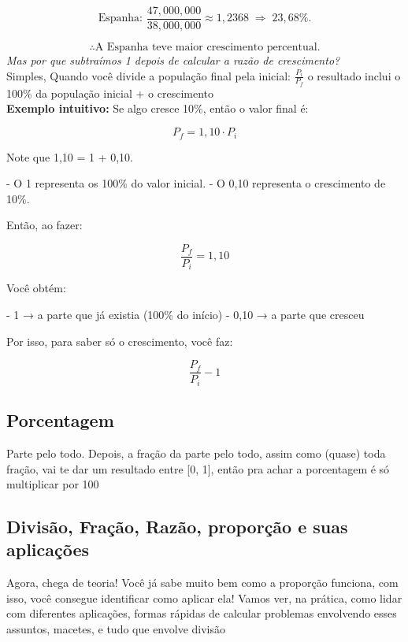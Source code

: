 \documentclass{article}
\begin{document}
\begin{itemize}
    \[
    \text{Espanha: } 
    \frac{47{,}000{,}000}{38{,}000{,}000} \approx 1{,}2368 
    \;\Rightarrow\; 23{,}68\%.
    \]
    
    \[
    \therefore \text{A Espanha teve maior crescimento percentual.}
    \]
    \textit{Mas por que subtraímos 1 depois de calcular a razão de crescimento?}
    \\[5pt]
    Simples, Quando você divide a população final pela inicial: $\frac{P_i}{P_f}$ o resultado inclui o 100\% da população inicial + o crescimento
    \\[5pt]
    \textbf{Exemplo intuitivo:} Se algo cresce 10\%, então o valor final é:

    \[
    P_f = 1,10 \cdot P_i
    \]
    
    Note que 1,10 = 1 + 0,10.
    
    - O 1 representa os 100\% do valor inicial.
    - O 0,10 representa o crescimento de 10\%.
    
    Então, ao fazer:
    
    \[
    \frac{P_f}{P_i} = 1,10
    \]
    
    Você obtém:
    
    - 1 → a parte que já existia (100\% do início)
    - 0,10 → a parte que cresceu
    
    Por isso, para saber só o crescimento, você faz:
    
    \[
    \frac{P_f}{P_i} - 1
    \]

    
\end{itemize}

\subsection{Porcentagem}
Parte pelo todo. Depois, a fração da parte pelo todo, assim como (quase) toda fração, vai te dar um resultado entre [0, 1], então pra achar a porcentagem é só multiplicar por 100

\subsection{Divisão, Fração, Razão, proporção e suas aplicações}
Agora, chega de teoria! Você já sabe muito bem como a proporção funciona, com isso, você consegue identificar como aplicar ela! Vamos ver, na prática, como lidar com diferentes aplicações, formas rápidas de calcular problemas envolvendo esses assuntos, macetes, e tudo que envolve divisão
\end{document}
